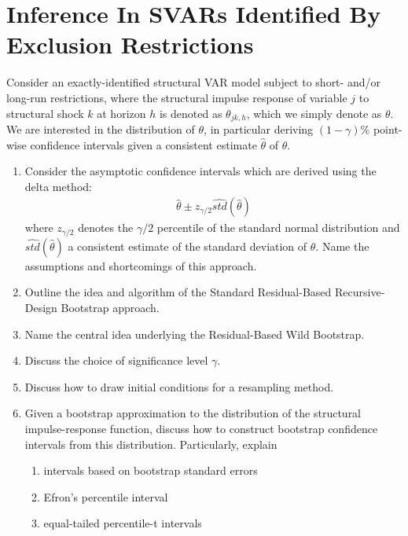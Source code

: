 \section[Inference In SVARs Identified By Exclusion Restrictions]{Inference In SVARs Identified By Exclusion Restrictions\label{ex:InferenceExclusionRestrictions}}
Consider an exactly-identified structural VAR model subject to short- and/or long-run restrictions,
  where the structural impulse response of variable \(j\) to structural shock \(k\) at horizon \(h\) is denoted as \(\theta_{jk,h}\),
  which we simply denote as \(\theta \).
We are interested in the distribution of \(\theta \),
  in particular deriving \((1-\gamma)\% \) point-wise confidence intervals given a consistent estimate \(\hat{\theta}\) of \(\theta \).

\begin{enumerate}	
\item Consider the asymptotic confidence intervals which are derived using the delta method:
\begin{align*}
\hat{\theta} \pm z_{\gamma/2} \widehat{std}(\hat{\theta})
\end{align*}
where \(z_{\gamma/2}\) denotes the \(\gamma/2\) percentile of the standard normal distribution
  and \( \widehat{std}(\hat{\theta})\) a consistent estimate of the standard deviation of \(\theta \).
Name the assumptions and shortcomings of this approach.

\item Outline the idea and algorithm of the Standard Residual-Based Recursive-Design Bootstrap approach.

\item Name the central idea underlying the Residual-Based Wild Bootstrap.

\item Discuss the choice of significance level \(\gamma \).

\item Discuss how to draw initial conditions for a resampling method.

\item Given a bootstrap approximation to the distribution of the structural impulse-response function,
  discuss how to construct bootstrap confidence intervals from this distribution.
Particularly, explain
    \begin{enumerate}
    \item intervals based on bootstrap standard errors
    \item Efron's percentile interval
    \item equal-tailed percentile-t intervals 		
    \end{enumerate}

\end{enumerate}

